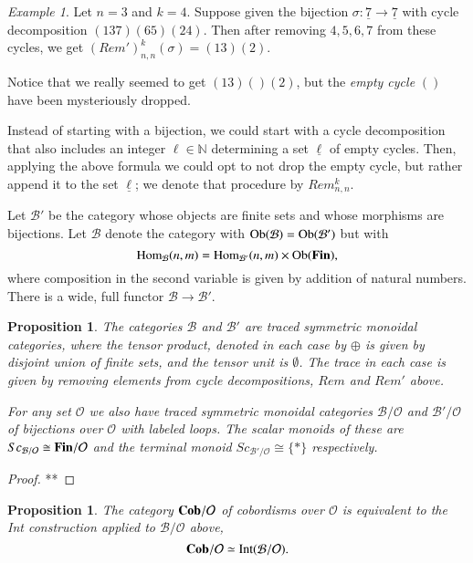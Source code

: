 \documentclass{amsart}
\def\tn{\textnormal}
\def\mc{\mathcal}
\def\NN{{\mathbb N}}
\def\Hom{\tn{Hom}}
\def\Ob{\tn{Ob}}
\def\singleton{{\{*\}}}
\def\to{\rightarrow}
\def\taking{\colon}
\def\iso{\cong}
\def\ul{\underline}
\def\Cob{{\bf Cob}}
\def\mcB{\mc{B}}
\def\mcO{\mc{O}}
\def\Fin{{\bf Fin}}
\def\Int{\tn{Int}}
\newtheorem{proposition}[subsubsection]{Proposition}
\theoremstyle{remark}
\newtheorem{example}[subsubsection]{Example}
\theoremstyle{definition}
\begin{document}
\begin{example}

Let $n=3$ and $k=4$. Suppose given the bijection $\sigma\taking\ul{7}\to\ul{7}$ with cycle decomposition $(1 3 7)(6 5)(2 4)$. Then after removing $4,5,6,7$ from these cycles, we get $(Rem')^k_{n,n}(\sigma)=(1 3)(2)$. 

Notice that we really seemed to get $(1 3)()(2)$, but the {\em empty cycle} $()$ have been mysteriously dropped.

\end{example}

Instead of starting with a bijection, we could start with a cycle decomposition that also includes an integer $\ell\in\NN$ determining a set $\ul\ell$ of empty cycles. Then, applying the above formula we could opt to not drop the empty cycle, but rather append it to the set $\ul\ell$; we denote that procedure by $Rem^k_{n,n}$.

Let $\mcB'$ be the category whose objects are finite sets and whose morphisms are bijections. Let $\mcB$ denote the category with $\Ob(\mcB)=\Ob(\mcB')$ but with 
$$\Hom_{\mcB}(n,m)=\Hom_{\mcB'}(n,m)\times\Ob(\Fin),$$
where composition in the second variable is given by addition of natural numbers. There is a wide, full functor $\mcB\to\mcB'$.

\begin{proposition}

The categories $\mcB$ and $\mcB'$ are traced symmetric monoidal categories, where the tensor product, denoted in each case by $\oplus$ is given by disjoint union of finite sets, and the tensor unit is $\emptyset$. The trace in each case is given by removing elements from cycle decompositions, $Rem$ and $Rem'$ above.

For any set $\mcO$ we also have traced symmetric monoidal categories $\mcB/\mcO$ and $\mcB'/\mcO$ of bijections over $\mcO$ with labeled loops. The scalar monoids of these are $Sc_{\mcB/\mcO}\iso\Fin/\mcO$ and the terminal monoid $Sc_{\mcB'/\mcO}\iso\singleton$ respectively. 

\end{proposition}

\begin{proof}

**

\end{proof}

\begin{proposition}

The category $\Cob/\mcO$ of cobordisms over $\mcO$ is equivalent to the Int construction applied to $\mcB/\mcO$ above,
$$\Cob/\mcO\simeq\Int(\mcB/\mcO).$$

\end{proposition}
\end{document}
